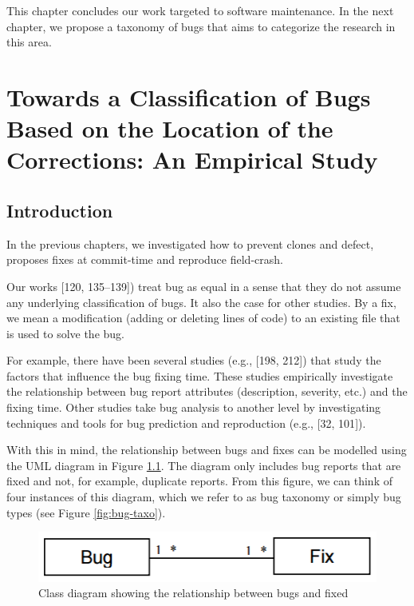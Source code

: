 \documentclass[12pt]{report}
\begin{document}
This chapter concludes our work targeted to software maintenance. In the
next chapter, we propose a taxonomy of bugs that aims to categorize the
research in this area.

\chapter{Towards a Classification of Bugs Based on the Location of the
Corrections: An Empirical
Study}\label{towards-a-classification-of-bugs-based-on-the-location-of-the-corrections-an-empirical-study}

\section{Introduction}\label{introduction-5}

In the previous chapters, we investigated how to prevent clones and
defect, proposes fixes at commit-time and reproduce field-crash.

Our works {[}120, 135--139{]}) treat bug as equal in a sense that they
do not assume any underlying classification of bugs. It also the case
for other studies. By a fix, we mean a modification (adding or deleting
lines of code) to an existing file that is used to solve the bug.

For example, there have been several studies (e.g., {[}198, 212{]}) that
study the factors that influence the bug fixing time. These studies
empirically investigate the relationship between bug report attributes
(description, severity, etc.) and the fixing time. Other studies take
bug analysis to another level by investigating techniques and tools for
bug prediction and reproduction (e.g., {[}32, 101{]}).

With this in mind, the relationship between bugs and fixes can be
modelled using the UML diagram in Figure \ref{fig:bug-taxo-diag}. The
diagram only includes bug reports that are fixed and not, for example,
duplicate reports. From this figure, we can think of four instances of
this diagram, which we refer to as bug taxonomy or simply bug types (see
Figure \ref{fig:bug-taxo}).

\begin{figure}[h!]
  \centering
    \includegraphics[scale=0.5]{media/chap9/bug-taxo-class-diag.png}
    \caption{Class diagram showing the relationship between bugs and fixed
    \label{fig:bug-taxo-diag}}
\end{figure}
\end{document}
